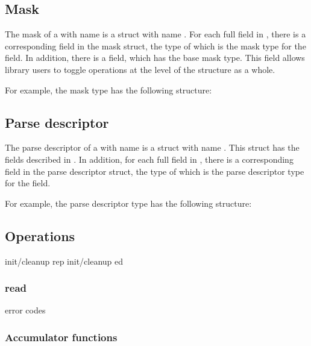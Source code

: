 \subsection{Mask}
\label{sec:structs-masks}
The mask of a \struct{} with name  is a \C{} struct 
with name .  For each full field in
, there is a corresponding field in the mask struct, the
type of which is the mask type for
the field.  In addition, there is a 
 field, which has the base mask type.  This field allows
library users to toggle operations at the level of the structure as a
whole. 

For example, the mask type  has the
following structure:


\subsection{Parse descriptor}
\label{sec:structs-parse-descriptors}
The parse descriptor of a \struct{} with name  is a \C{}
struct with name .  This struct has the fields
described in . In addition, for
each full field in , there is a corresponding field in
the parse descriptor struct, the type of which is the parse descriptor
type for the field.

For example, the parse descriptor type  has
the following structure:

\subsection{Operations}
init/cleanup rep
init/cleanup ed
\subsubsection{read}
  error codes
\subsubsection{Accumulator functions}

